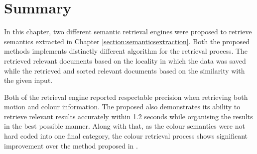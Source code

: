 \section{Summary}

In this chapter, two different semantic retrieval engines were proposed to retrieve semantics extracted in Chapter \ref{section:semanticsextraction}.
Both the proposed methods implements distinctly different algorithm for the retrieval process. The \versionOneRet retrieved relevant documents based on the locality in which the data was saved while the \versionTwoRet retrieved and sorted relevant documents based on the similarity with the given input.

Both of the retrieval engine reported respectable precision when retrieving both motion and colour information. The proposed \versionTwoRet also demonstrates its ability to retrieve relevant results accurately within 1.2 seconds while organising the results in the best possible manner. Along with that, as the colour semantics were not hard coded into one final category, the colour retrieval process shows significant improvement over the method proposed in \versionOneRet.


